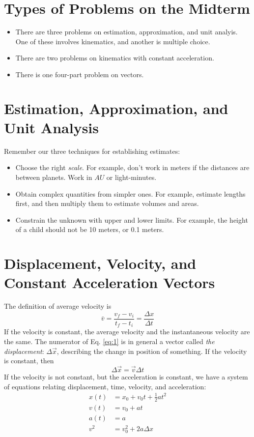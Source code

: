 \documentclass[10pt]{article}
\begin{document}
\maketitle

\section{Types of Problems on the Midterm}
\begin{itemize}
\item There are three problems on estimation, approximation, and unit analyis.  One of these involves kinematics, and another is multiple choice.
\item There are two problems on kinematics with constant acceleration.
\item There is one four-part problem on vectors.
\end{itemize}

\section{Estimation, Approximation, and Unit Analysis}
Remember our three techniques for establishing estimates:
\begin{itemize}
\item Choose the right \textit{scale}.  For example, don't work in meters if the distances are between planets.  Work in $AU$ or light-minutes.
\item Obtain complex quantities from simpler ones.  For example, estimate lengths first, and then multiply them to estimate volumes and areas.
\item Constrain the unknown with upper and lower limits.  For example, the height of a child should not be 10 meters, or 0.1 meters.
\end{itemize}

\section{Displacement, Velocity, and Constant Acceleration Vectors}
The definition of average velocity is
\begin{equation}
\bar{v} = \frac{v_{f} - v_{i}}{t_{f} - t_{i}} = \frac{\Delta x}{\Delta t}
\label{eq:1}
\end{equation}
If the velocity is constant, the average velocity and the instantaneous velocity are the same.  The numerator of Eq. \ref{eq:1} is in general a vector called \textit{the displacement}: $\Delta \vec{x}$, describing the change in position of something.  If the velocity is constant, then
\begin{equation}
\Delta \vec{x} = \vec{v}\Delta t
\label{eq:2}
\end{equation}
If the velocity is not constant, but the acceleration is constant, we have a system of equations relating displacement, time, velocity, and acceleration:
\begin{align}
x(t) &= x_0 + v_0 t + \frac{1}{2} a t^2 \\
v(t) &= v_0 + a t \\
a(t) &= a \\
v^2 &= v_0^2 + 2a\Delta x
\end{align}
\end{document}
